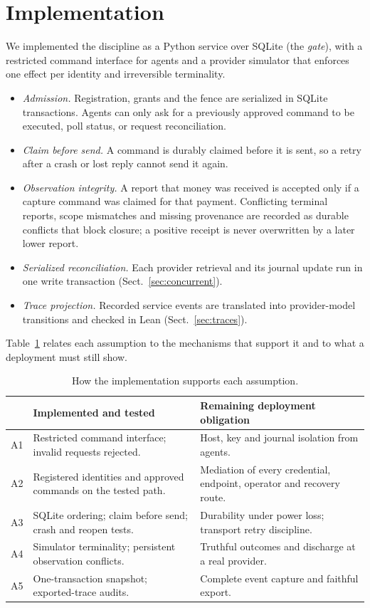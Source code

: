 \documentclass[runningheads]{llncs}
\begin{document}
\section{Implementation}
\label{sec:impl}
We implemented the discipline as a Python service over SQLite (the
\emph{gate}), with a restricted command interface for agents and a provider
simulator that enforces one effect per identity and irreversible terminality.
\begin{itemize}
\item \emph{Admission.} Registration, grants and the fence are serialized in
SQLite transactions. Agents can only ask for a previously approved command to
be executed, poll status, or request reconciliation.
\item \emph{Claim before send.} A command is durably claimed before it is sent,
so a retry after a crash or lost reply cannot send it again.
\item \emph{Observation integrity.} A report that money was received is accepted
only if a capture command was claimed for that payment. Conflicting terminal
reports, scope mismatches and missing provenance are recorded as durable
conflicts that block closure; a positive receipt is never overwritten by a
later lower report.
\item \emph{Serialized reconciliation.} Each provider retrieval and its journal
update run in one write transaction (Sect.~\ref{sec:concurrent}).
\item \emph{Trace projection.} Recorded service events are translated into
provider-model transitions and checked in Lean (Sect.~\ref{sec:traces}).
\end{itemize}
Table~\ref{tab:assumption_evidence} relates each assumption to the mechanisms
that support it and to what a deployment must still show.

\begin{table}[t]
\centering\small
\caption{How the implementation supports each assumption.}
\label{tab:assumption_evidence}
\begin{tabularx}{\linewidth}{@{}l >{\raggedright\arraybackslash}X >{\raggedright\arraybackslash}X@{}}
\toprule
& Implemented and tested & Remaining deployment obligation \\
\midrule
A1 & Restricted command interface; invalid requests rejected. & Host, key and journal isolation from agents. \\
A2 & Registered identities and approved commands on the tested path. & Mediation of every credential, endpoint, operator and recovery route. \\
A3 & SQLite ordering; claim before send; crash and reopen tests. & Durability under power loss; transport retry discipline. \\
A4 & Simulator terminality; persistent observation conflicts. & Truthful outcomes and discharge at a real provider. \\
A5 & One-transaction snapshot; exported-trace audits. & Complete event capture and faithful export. \\
\bottomrule
\end{tabularx}
\end{table}
\end{document}
